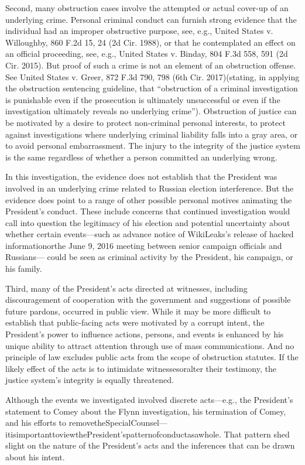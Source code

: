 {Second, many obstruction cases involve the attempted or actual cover-up of an underlying crime. Personal criminal conduct can furnish strong evidence that the individual had an improper obstructive purpose, see, e.g., United States v. Willoughby, 860 F.2d 15, 24 (2d Cir. 1988), or that he contemplated an effect on an official proceeding, see, e.g., United States v. Binday, 804 F.3d 558, 591 (2d Cir. 2015). But proof of such a crime is not an element of an obstruction offense. See United States v. Greer, 872 F.3d 790, 798 (6th Cir. 2017)(stating, in applying the obstruction sentencing guideline, that “obstruction of a criminal investigation is punishable even if the prosecution is ultimately unsuccessful or even if the investigation ultimately reveals no underlying crime”). Obstruction of justice can be motivated by a desire to protect non-criminal personal interests, to protect against investigations where underlying criminal liability falls into a gray area, or to avoid personal embarrassment. The injury to the integrity of the justice system is the same regardless of whether a person committed an underlying wrong.

In this investigation, the evidence does not establish that the President was involved in an underlying crime related to Russian election interference. But the evidence does point to a range of other possible personal motives animating the President's conduct. These include concerns that continued investigation would call into question the legitimacy of his election and potential uncertainty about whether certain events—such as advance notice of WikiLeaks's release of hacked informationorthe June 9, 2016 meeting between senior campaign officials and Russians— could be seen as criminal activity by the President, his campaign, or his family.

Third, many of the President's acts directed at witnesses, including discouragement of cooperation with the government and suggestions of possible future pardons, occurred in public view. While it may be more difficult to establish that public-facing acts were motivated by a corrupt intent, the President's power to influence actions, persons, and events is enhanced by his unique ability to attract attention through use of mass communications. And no principle of law excludes public acts from the scope of obstruction statutes. If the likely effect of the acts is to intimidate witnessesoralter their testimony, the justice system's integrity is equally threatened.

Although the events we investigated involved discrete acts—e.g., the President's statement to Comey about the Flynn investigation, his termination of Comey, and his efforts to removetheSpecialCounsel—itisimportanttoviewthePresident'spatternofconductasawhole. That pattern shed slight on the nature of the President's acts and the inferences that can be drawn about his intent.

}
